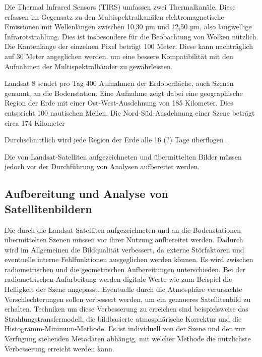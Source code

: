 Die Thermal Infrared Sensors (TIRS) \cite{Chaudhary2011} umfassen zwei Thermalkanäle. Diese erfassen im Gegensatz zu den Multispektralkanälen elektromagnetische Emissionen mit Wellenlängen zwischen 10,30 µm und 12,50 µm, also langwellige Infrarotstrahlung. Dies ist insbesondere für die Beobachtung von Wolken nützlich. Die Kantenlänge der einzelnen Pixel beträgt 100 Meter. Diese kann nachträglich auf 30 Meter angeglichen werden, um eine bessere Kompatibilität mit den Aufnahmen der Multispektralbänder zu gewährleisten.

Landsat 8 sendet pro Tag 400 Aufnahmen der Erdoberfläche, auch Szenen genannt, an die Bodenstation. Eine Aufnahme zeigt dabei eine geographische Region der Erde mit einer Ost-West-Ausdehnung von 185 Kilometer. Dies entspricht 100 nautischen Meilen. Die Nord-Süd-Ausdehnung einer Szene beträgt circa 174 Kilometer 

Durchschnittlich wird jede Region der Erde alle 16 (?) Tage überflogen \cite{Irons2012}.

Die von Landsat-Satelliten aufgezeichneten und übermittelten Bilder müssen jedoch vor der Durchführung von Analysen aufbereitet werden.


\subsection{Aufbereitung und Analyse von Satellitenbildern}
Die durch die Landsat-Satelliten aufgezeichneten und an die Bodenstationen übermittelten Szenen müssen vor ihrer Nutzung aufbereitet werden. Dadurch wird im Allgemeinen die Bildqualität verbessert, da externe Störfaktoren und eventuelle interne Fehlfunktionen ausgeglichen werden können. Es wird zwischen radiometrischen und die geometrischen Aufbereitungen unterschieden. Bei der radiometrischen Aufarbeitung werden digitale Werte wie zum Beispiel die Helligkeit der Szene angepasst. Eventuelle durch die Atmosphäre verursachte Verschlechterungen sollen verbessert werden, um ein genaueres Satellitenbild zu erhalten. Techniken um diese Verbesserung zu erreichen sind beispielsweise das Strahlungstransfermodell, die bildbasierte atmosphärische Korrektur und die Histogramm-Minimum-Methode. Es ist individuell von der Szene und den zur Verfügung stehenden Metadaten abhängig, mit welcher Methode die nützlichste Verbesserung erreicht werden kann.

